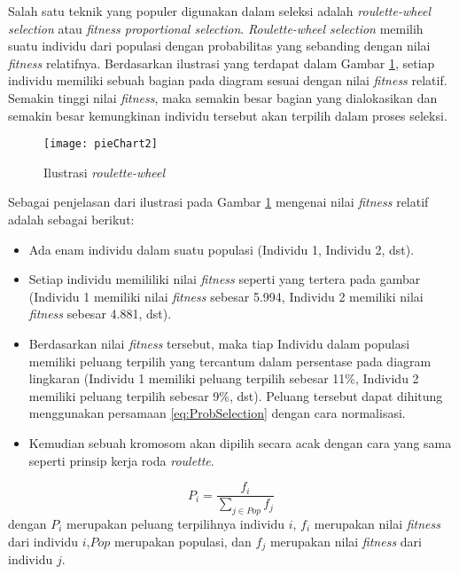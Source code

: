 Salah satu teknik yang populer digunakan dalam seleksi adalah \textit{roulette-wheel selection} atau \textit{fitness proportional selection}. \textit{Roulette-wheel selection} memilih suatu individu dari populasi dengan probabilitas yang sebanding dengan nilai \textit{fitness} relatifnya. Berdasarkan ilustrasi yang terdapat dalam Gambar \ref{fig:pieChart}, setiap individu memiliki sebuah bagian pada diagram sesuai dengan nilai \textit{fitness} relatif. Semakin tinggi nilai \textit{fitness}, maka semakin besar bagian yang dialokasikan dan semakin besar kemungkinan individu tersebut akan terpilih dalam proses seleksi.

\begin{figure}[H]
	\begin{center}
		\texttt{[image: pieChart2]}
		\caption{Ilustrasi \textit{roulette-wheel}}
		\label{fig:pieChart}
	\end{center}
\end{figure}

Sebagai penjelasan dari ilustrasi pada Gambar \ref{fig:pieChart} mengenai nilai \textit{fitness} relatif adalah sebagai berikut:
\begin{itemize}
	\item Ada enam individu dalam suatu populasi (Individu 1, Individu 2, dst).
	\item Setiap individu memililiki nilai \textit{fitness} seperti yang tertera pada gambar (Individu 1 memiliki nilai \textit{fitness} sebesar 5.994, Individu 2 memiliki nilai \textit{fitness} sebesar 4.881, dst).
	\item Berdasarkan nilai \textit{fitness} tersebut, maka tiap Individu dalam populasi memiliki peluang terpilih yang tercantum dalam persentase pada diagram lingkaran (Individu 1 memiliki peluang terpilih sebesar 11\%, Individu 2 memiliki peluang terpilih sebesar 9\%, dst). Peluang tersebut dapat dihitung menggunakan persamaan \ref{eq:ProbSelection} dengan cara normalisasi.
	\item Kemudian sebuah kromosom akan dipilih secara acak dengan cara yang sama seperti prinsip kerja roda \textit{roulette}.
\end{itemize}

\begin{equation}
	\label{eq:ProbSelection}
	P_i=\frac{f_i}{\sum_{j \in Pop} f_j}
\end{equation}
dengan $P_i$ merupakan peluang terpilihnya individu $i$, $f_i$ merupakan nilai \textit{fitness} dari individu $i$,$Pop$ merupakan populasi, dan $f_j$ merupakan nilai \textit{fitness} dari individu $j$.

